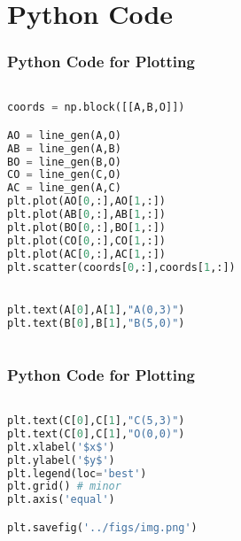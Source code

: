 \documentclass{beamer}
\theoremstyle{remark}
\numberwithin{equation}{section}
\begin{document}
\section{Python Code}
\begin{frame}[fragile]
\frametitle{Python Code for Plotting}
\begin{lstlisting}[language=Python]   

coords = np.block([[A,B,O]])

AO = line_gen(A,O)
AB = line_gen(A,B)
BO = line_gen(B,O)
CO = line_gen(C,O)
AC = line_gen(A,C)
plt.plot(AO[0,:],AO[1,:])
plt.plot(AB[0,:],AB[1,:])
plt.plot(BO[0,:],BO[1,:])
plt.plot(CO[0,:],CO[1,:])
plt.plot(AC[0,:],AC[1,:])
plt.scatter(coords[0,:],coords[1,:])


plt.text(A[0],A[1],"A(0,3)")
plt.text(B[0],B[1],"B(5,0)")



\end{lstlisting}

\end{frame}
\begin{frame}[fragile]
\frametitle{Python Code for Plotting}
\begin{lstlisting}[language=Python]   

plt.text(C[0],C[1],"C(5,3)")
plt.text(C[0],C[1],"O(0,0)")
plt.xlabel('$x$')
plt.ylabel('$y$')
plt.legend(loc='best')
plt.grid() # minor
plt.axis('equal')

plt.savefig('../figs/img.png')


\end{lstlisting}

\end{frame}
\end{document}
